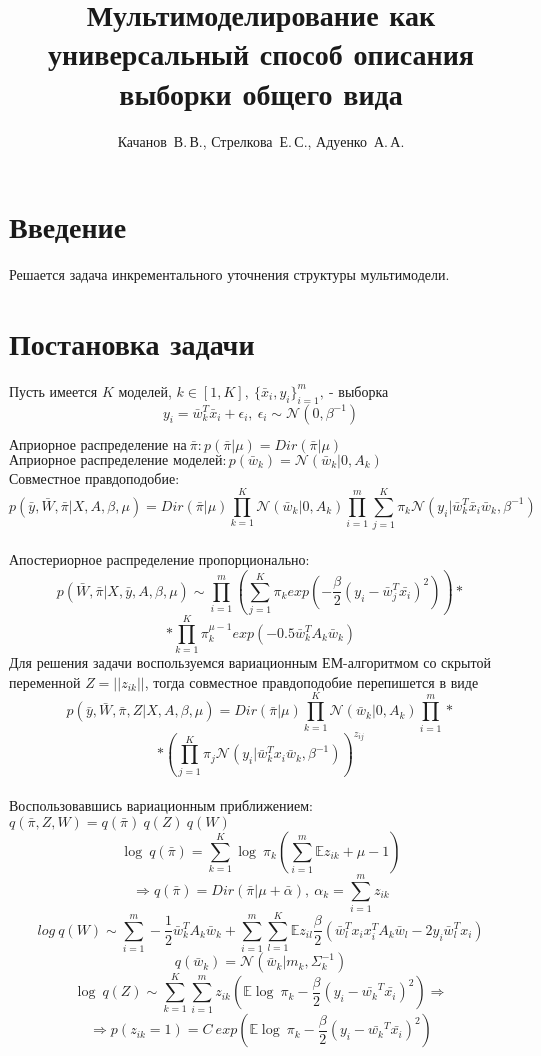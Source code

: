 \documentclass[12pt,twoside]{article}
\title
    [Мультимоделирование как универсальный способ описания выборки общего вида] %
    {Мультимоделирование как универсальный способ описания выборки общего вида}
\author
    [Автор~И.\,О.] %
    {Качанов~В.\,В., Стрелкова~Е.\,С., Адуенко~А.\,А.} %
\begin{document}
\maketitle
\section{Введение}
Решается задача инкрементального уточнения структуры мультимодели. 

\section{Постановка задачи}
Пусть имеется $K$ моделей, $k \in [1,K],~\{\bar{x}_i,y_i\}_{i=1}^m,~\text{- выборка}$
$$y_i = \bar{w}_k^T\bar{x}_i+\epsilon_i,~ \epsilon_i \sim \mathcal{N}(0,\beta^{-1})$$

$\text{Априорное распределение на}~ \bar{\pi}: p(\bar{\pi} |\mu) = Dir(\bar{\pi}|\mu)$
$\text{Априорное распределение моделей}: p(\bar{w}_k) = \mathcal{N}(\bar{w}_k|0,A_k)$\\
Совместное правдоподобие:
$$p(\bar{y},\bar{W},\bar{\pi}|X,A,\beta,\mu)=Dir(\bar{\pi}|\mu)\prod\limits_{k=1}^K \mathcal{N}(\bar{w}_k|0,A_k)\prod\limits_{i=1}^m  \sum\limits_{j=1}^K\pi_k \mathcal{N}(y_i|\bar{w}_k^T \bar x_i\bar{w}_k,\beta^{-1})$$\\
Апостериорное распределение пропорционально:
$$p(\bar{W},\bar{\pi}|X,\bar y,A,\beta,\mu)\sim \prod\limits_{i=1}^m\left(\sum\limits_{j=1}^K \pi_k exp\left(-\frac{\beta}{2}(y_i - \bar{w}_j^T\bar{x_i})^2\right)\right)*$$
$$*\prod\limits_{k=1}^K\pi_k^{\mu-1}exp(-0.5\bar{w}_k^TA_k\bar{w}_k)$$
Для решения задачи воспользуемся вариационным ЕМ-алгоритмом со скрытой переменной $Z = ||z_{ik}||$, тогда совместное правдоподобие перепишется в виде
$$p(\bar{y},\bar{W},\bar{\pi},Z|X,A,\beta,\mu)=Dir(\bar{\pi}|\mu)\prod\limits_{k=1}^K \mathcal{N}(\bar{w}_k|0,A_k)\prod\limits_{i=1}^m *$$
$$*\left( \prod\limits_{j=1}^K\pi_j \mathcal{N}(y_i|\bar{w}_k^T x_i\bar{w}_k,\beta^{-1})\right)^{z_{ij}}$$\\
Воспользовавшись вариационным приближением: ~$ q(\bar{\pi},Z,W) = q(\bar{\pi})~q(Z)~q(W)$\\

$$\log~q(\bar{\pi}) = \sum\limits_{k=1}^K \log~\pi_k\left( \sum\limits_{i=1}^m\mathbb{E}z_{ik}+\mu-1\right)$$
$$ \Rightarrow q(\bar{\pi}) = Dir(\bar{\pi}|\mu + \bar{\alpha}),~ \alpha_k=\sum\limits_{i=1}^m z_{ik}$$
$$log~q(W) \sim \sum\limits_{i=1}^m-\frac{1}{2}\bar{w}_k^TA_k\bar{w}_k + \sum\limits_{i=1}^m \sum\limits_{l=1}^K \mathbb{E}z_{il}\frac{\beta}{2}\left(\bar{w}_l^Tx_ix_i^TA_k\bar{w}_l - 2y_i\bar{w}_l^Tx_i\right)$$
$$q(\bar{w}_k) = \mathcal{N}(\bar{w}_k|m_k, \Sigma_k^{-1})$$
$$\log~q(Z) \sim \sum \limits_{k=1}^{K} \sum \limits_{i=1}^{m} z_{ik} \left(\mathbb{E} \log~\pi_k - \frac{\beta}{2}(y_i-\bar{w_k}^T \bar{x_i})^2 \right) \Rightarrow$$
$$\Rightarrow p(z_{ik} = 1) = C~exp \left(\mathbb{E} \log~\pi_k -  \frac{\beta}{2}(y_i-\bar{w_k}^T \bar{x_i})^2 \right)$$
\end{document}
